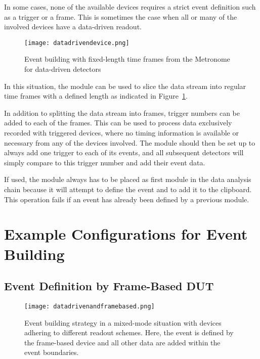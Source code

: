 In some cases, none of the available devices requires a strict event definition such as a trigger or a frame.
This is sometimes the case when all or many of the involved devices have a data-driven readout.

\begin{figure}[tbp]
        \centering
        \texttt{[image: datadrivendevice.png]}
        \caption{Event building with fixed-length time frames from the Metronome for data-driven detectors}
        \label{fig:datadriven}
\end{figure}

In this situation, the  module can be used to slice the data stream into regular time frames with a defined length as indicated in Figure~\ref{fig:datadriven}.

In addition to splitting the data stream into frames, trigger numbers can be added to each of the frames.
This can be used to process data exclusively recorded with triggered devices, where no timing information is available or necessary from any of the devices involved.
The module should then be set up to always add one trigger to each of its events, and all subsequent detectors will simply compare to this trigger number and add their event data.

If used, the  module always has to be placed as first module in the data analysis chain because it will attempt to define the event and to add it to the clipboard. This operation fails if an event has already been defined by a previous module.


\section{Example Configurations for Event Building}

\subsection{Event Definition by Frame-Based DUT}

\begin{figure}[tbp]
        \centering
        \texttt{[image: datadrivenandframebased.png]}
        \caption{Event building strategy in a mixed-mode situation with devices adhering to different readout schemes. Here, the event is defined by the frame-based device and all other data are added within the event boundaries.}
        \label{fig:datadrivenandframebased}
\end{figure}

